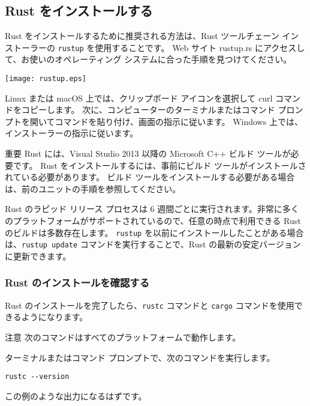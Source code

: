 \subsection{Rust をインストールする}

Rust をインストールするために推奨される方法は、Rust ツールチェーン インストーラーの \texttt{rustup} を使用することです。 Web サイト rustup.rs にアクセスして、お使いのオペレーティング システムに合った手順を見つけてください。

\texttt{[image: rustup.eps]}

Linux または macOS 上では、クリップボード アイコンを選択して curl コマンドをコピーします。 次に、コンピューターのターミナルまたはコマンド プロンプトを開いてコマンドを貼り付け、画面の指示に従います。 Windows 上では、インストーラーの指示に従います。

\begin{itembox}[l]{重要}
Rust には、Visual Studio 2013 以降の Microsoft C++ ビルド ツールが必要です。 Rust をインストールするには、事前にビルド ツールがインストールされている必要があります。 ビルド ツールをインストールする必要がある場合は、前のユニットの手順を参照してください。
\end{itembox}

Rust のラピッド リリース プロセスは 6 週間ごとに実行されます。非常に多くのプラットフォームがサポートされているので、任意の時点で利用できる Rust のビルドは多数存在します。 \texttt{rustup} を以前にインストールしたことがある場合は、\texttt{rustup update} コマンドを実行することで、Rust の最新の安定バージョンに更新できます。

\subsubsection{Rust のインストールを確認する}

Rust のインストールを完了したら、\texttt{rustc} コマンドと \texttt{cargo} コマンドを使用できるようになります。

\begin{itembox}[l]{注意}
次のコマンドはすべてのプラットフォームで動作します。
\end{itembox}

ターミナルまたはコマンド プロンプトで、次のコマンドを実行します。


\begin{lstlisting}[numbers=none]
rustc --version
\end{lstlisting}

この例のような出力になるはずです。

